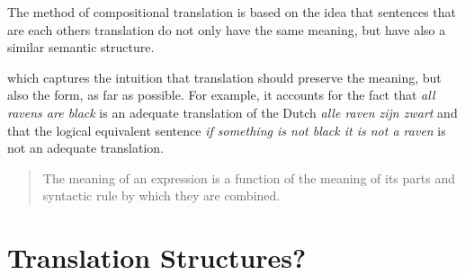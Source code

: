 \documentclass{report}
\theoremstyle{indented}
\begin{document}
The method of compositional translation is based on the idea that sentences that are each others translation do not only have the same meaning, but have also a similar semantic structure. 


which captures the intuition that translation should preserve the meaning, but also the form, as far as possible. For example, it accounts for the fact that \textit{all ravens are black} is an adequate translation of the Dutch \textit{alle raven zijn zwart} and that the logical equivalent sentence \textit{if something is not black it is not a raven} is not an adequate translation. \cite{landsbergen1989power}






\begin{quote}
The meaning of an expression is a function of the meaning of its parts and syntactic rule by which they are combined. \cite{partee1984compositionality}
\end{quote}



\section{Translation Structures?}
\end{document}

